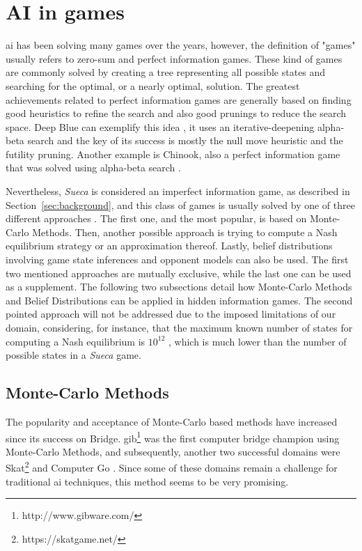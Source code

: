 \section{AI in games}

\ac{ai} has been solving many games over the years, however, the definition of "games" usually refers to zero-sum and perfect information games.
These kind of games are commonly solved by creating a tree representing all possible states and searching for the optimal, or a nearly optimal, solution.
The greatest achievements related to perfect information games are generally based on finding good heuristics to refine the search and also good prunings to reduce the search space.
Deep Blue can exemplify this idea \cite{Campbell2002}, it uses an iterative-deepening alpha-beta search and the key of its success is mostly the null move heuristic and the futility pruning.
Another example is Chinook, also a perfect information game that was solved using alpha-beta search \cite{Schaeffer1996}.

Nevertheless, \emph{Sueca} is considered an imperfect information game, as described in Section~\ref{sec:background}, and this class of games is usually solved by one of three different approaches \cite{Cowling2012}.
The first one, and the most popular, is based on Monte-Carlo Methods.
Then, another possible approach is trying to compute a Nash equilibrium strategy or an approximation thereof.
Lastly, belief distributions involving game state inferences and opponent models can also be used.
The first two mentioned approaches are mutually exclusive, while the last one can be used as a supplement.
The following two subsections detail how Monte-Carlo Methods and Belief Distributions can be applied in hidden information games.
The second pointed approach will not be addressed due to the imposed limitations of our domain, considering, for instance, that the maximum known number of states for computing a Nash equilibrium is $10^{12}$ \cite{Zinkevich}, which is much lower than the number of possible states in a \emph{Sueca} game.




\subsection{Monte-Carlo Methods}

The popularity and acceptance of Monte-Carlo based methods have increased since its success on Bridge.
\ac{gib}\footnote{http://www.gibware.com/} was the first computer bridge champion using Monte-Carlo Methods, and subsequently, another two successful domains were Skat\footnote{https://skatgame.net/} and Computer Go \cite{Gelly2011}.
Since some of these domains remain a challenge for traditional \ac{ai} techniques, this method seems to be very promising.


